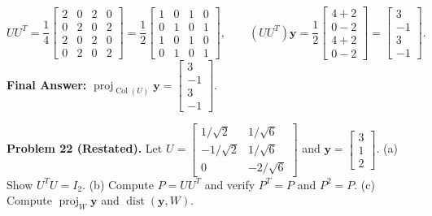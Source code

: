 \documentclass[11pt, letterpaper]{article}
\theoremstyle{definition}
\theoremstyle{remark}
\begin{document}
\[
UU^T = \frac{1}{4}\begin{bmatrix} 2 & 0 & 2 & 0 \\ 0 & 2 & 0 & 2 \\ 2 & 0 & 2 & 0 \\ 0 & 2 & 0 & 2 \end{bmatrix} = \frac{1}{2}\begin{bmatrix} 1 & 0 & 1 & 0 \\ 0 & 1 & 0 & 1 \\ 1 & 0 & 1 & 0 \\ 0 & 1 & 0 & 1 \end{bmatrix}, \qquad (UU^T)\mathbf{y} = \frac{1}{2}\begin{bmatrix} 4 + 2 \\ 0 - 2 \\ 4 + 2 \\ 0 - 2 \end{bmatrix} = \begin{bmatrix} 3 \\ -1 \\ 3 \\ -1 \end{bmatrix}.
\]
\textbf{Final Answer:} $\operatorname{proj}_{\operatorname{Col}(U)} \mathbf{y} = \begin{bmatrix} 3 \\ -1 \\ 3 \\ -1 \end{bmatrix}$.

\medskip
\textbf{Problem 22 (Restated).} Let $U = \begin{bmatrix} 1/\sqrt{2} & 1/\sqrt{6} \\ -1/\sqrt{2} & 1/\sqrt{6} \\ 0 & -2/\sqrt{6} \end{bmatrix}$ and $\mathbf{y} = \begin{bmatrix} 3 \\ 1 \\ 2 \end{bmatrix}$. (a) Show $U^T U = I_2$. (b) Compute $P = UU^T$ and verify $P^T = P$ and $P^2 = P$. (c) Compute $\operatorname{proj}_W \mathbf{y}$ and $\operatorname{dist}(\mathbf{y}, W)$.
\end{document}
